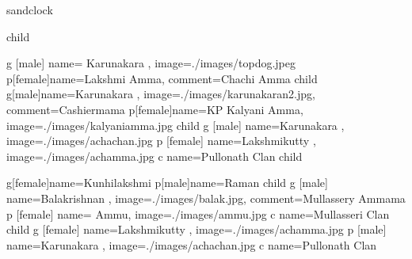 \documentclass{article}
\begin{document}
\begin{landscape}
\begin{genealogypicture} [
processing=database,
database format=medium marriage below,
node size=2.4cm,
level size=3.5cm,
level distance=6mm,
list separators hang,
name font=\bfseries,
surn code={\textcolor{red!50!black}{#1}},
place text={\newline}{},
date format=d/mon/yyyy,
tcbset={male/.style={colframe=blue,colback=blue!5},
female/.style={colframe=red,colback=red!5}},
box={fit basedim=7pt,boxsep=2pt,segmentation style=solid,
halign=left,before upper=\parskip1pt,
\gtrDBsex,drop fuzzy shadow,
if image defined={add to width=25mm,right=25mm,
underlay={\begin{tcbclipinterior}\path[fill overzoom DBimage]
([xshift=-24mm]interior.south east) rectangle (interior.north east);
\end{tcbclipinterior}},
}{},
},
]

sandclock {
	child {
  		g [male]  {name={ Karunakara }, image={./images/topdog.jpeg}}
  		p[female]{name={Lakshmi Amma}, comment={Chachi Amma}}
  		child {
  			 g[male]{name=Karunakara , image={./images/karunakaran2.jpg}, comment={Cashiermama}}
   			p[female]{name={KP Kalyani Amma}, image={./images/kalyaniamma.jpg}}
   			child {
    				g [male] {name=Karunakara , image={./images/achachan.jpg}}
    				p [female] {name=Lakshmikutty , image={./images/achamma.jpg}}
				c {name=Pullonath Clan}
   			}
  		}
  		child {
   			g[female]{name={Kunhilakshmi }}
   			p[male]{name={Raman }}
   			child {
    				g [male] {name=Balakrishnan  , image={./images/balak.jpg}, comment={Mullassery Ammama}}
    				p [female] {name= Ammu, image={./images/ammu.jpg}}
				c {name=Mullasseri Clan}
   			}
			child {
    				g [female] {name=Lakshmikutty , image={./images/achamma.jpg}}
				p [male] {name=Karunakara , image={./images/achachan.jpg}}
				c {name=Pullonath Clan}
   			}

}}}
\end{genealogypicture}
\end{landscape}
\end{document}
